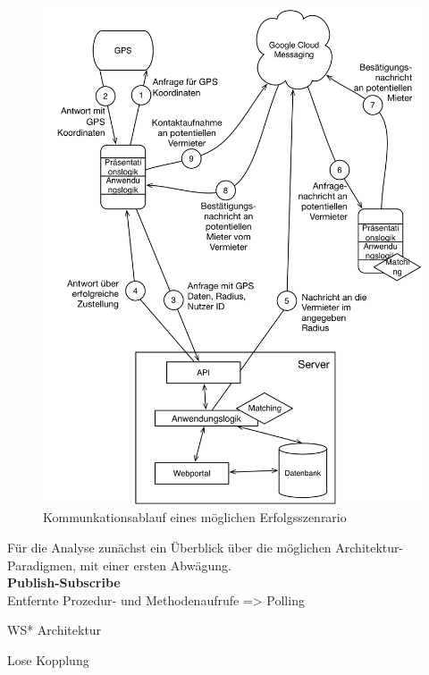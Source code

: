 \begin{figure}[H]
\includegraphics[width=.9\textwidth]{./images/kommunkationsablauf.png}
\caption{Kommunkationsablauf eines möglichen Erfolgsszenrario}
\label{kommunkationsablauf}
\end{figure}


Für die Analyse zunächst ein Überblick über die möglichen Architektur-Paradigmen, mit einer ersten Abwägung.\\

\textbf{Publish-Subscribe}\\


Entfernte Prozedur- und Methodenaufrufe => Polling

WS* Architektur


Lose Kopplung
